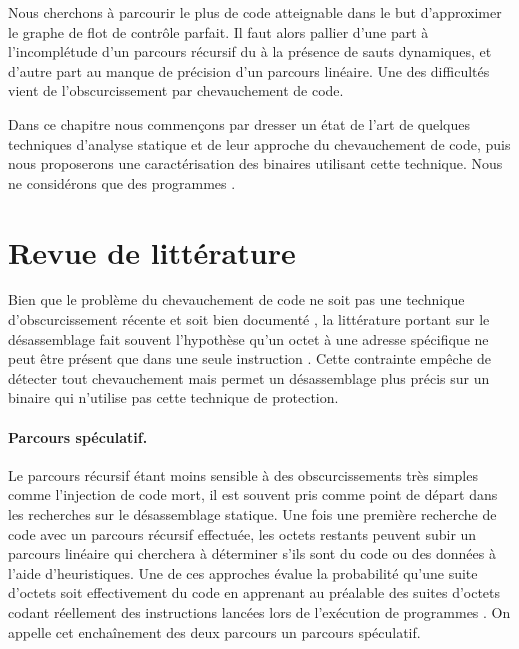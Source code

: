 Nous cherchons à parcourir le plus de code atteignable dans le but d'approximer le graphe de flot de contrôle parfait.
Il faut alors pallier d'une part à l'incomplétude d'un parcours récursif du à la présence de sauts dynamiques, et d'autre part au manque de précision d'un parcours linéaire.
Une des difficultés vient de l'obscurcissement par chevauchement de code. 

Dans ce chapitre nous commençons par dresser un état de l'art de quelques techniques d'analyse statique et de leur approche du chevauchement de code, puis nous proposerons une caractérisation des binaires utilisant cette technique.
Nous ne considérons que des programmes \nsms.


\section{Revue de littérature}
Bien que le problème du chevauchement de code ne soit pas une technique d'obscurcissement récente et soit bien documenté \cite{PMA}, la littérature portant sur le désassemblage fait souvent l'hypothèse qu'un octet à une adresse spécifique ne peut être présent que dans une seule instruction \cite{KruegelRVV04}. 
Cette contrainte empêche de détecter tout chevauchement mais permet un désassemblage plus précis sur un binaire qui n'utilise pas cette technique de protection.


\paragraph{Parcours spéculatif.}
Le parcours récursif étant moins sensible à des obscurcissements très simples comme l'injection de code mort, il est souvent pris comme point de départ dans les recherches sur le désassemblage statique.
Une fois une première recherche de code avec un parcours récursif effectuée, les octets restants peuvent subir un parcours linéaire qui cherchera à déterminer s'ils sont du code ou des données à l'aide d'heuristiques.
Une de ces approches évalue la probabilité qu'une suite d'octets soit effectivement du code en apprenant au préalable des suites d'octets codant réellement des instructions lancées lors de l'exécution de programmes \cite{KDF09}.
On appelle cet enchaînement des deux parcours un parcours spéculatif.

